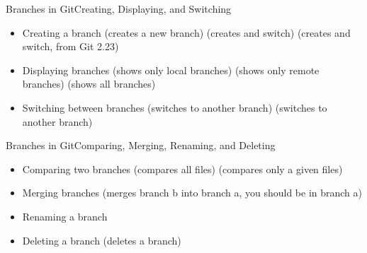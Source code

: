  \begin{frame}{Branches in Git}{Creating, Displaying, and Switching}
  \begin{itemize}
\item Creating a branch
   (creates a new branch)
   (creates and switch)
   (creates and switch, from Git 2.23)
\item Displaying branches
   (shows only local branches)
   (shows only remote branches)
   (shows all branches)
\item Switching between branches
   (switches to another branch)
   (switches to another branch)
\end{itemize}
\end{frame}

 \begin{frame}{Branches in Git}{Comparing, Merging, Renaming, and Deleting}
  \begin{itemize}
\item Comparing two branches
   (compares all files)
   (compares only a given files)
\item Merging branches
   (merges branch b into branch a, you should be in branch a)
\item Renaming a branch
\item Deleting a branch 
   (deletes a branch)
\end{itemize}
\end{frame}
